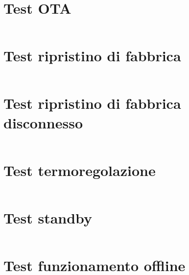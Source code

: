 \documentclass[12pt,a4paper,twoside,titlepage]{book}
\begin{document}
\section{Test OTA}
\label{section:impl_test_ota}
\inputminted[]{python3}{src/test_ota.py}

\section{Test ripristino di fabbrica}
\label{section:impl_test_factory_reset}
\inputminted[]{python3}{src/test_factory_reset.py}

\section{Test ripristino di fabbrica disconnesso}
\label{section:impl_test_factory_reset_unbounded}
\inputminted[]{python3}{src/test_factory_reset_unbounded.py}

\section{Test termoregolazione}
\label{section:impl_test_thermoregulation}
\inputminted[]{python3}{src/test_thermoregulation.py}

\section{Test standby}
\label{section:impl_test_standby}
\inputminted[]{python3}{src/test_standby.py}

\section{Test funzionamento offline}
\label{section:impl_test_offline_working}
\inputminted[]{python3}{src/test_offline_working.py}

\clearpage

\printglossary
\printglossary[type=\acronymtype]
\end{document}
